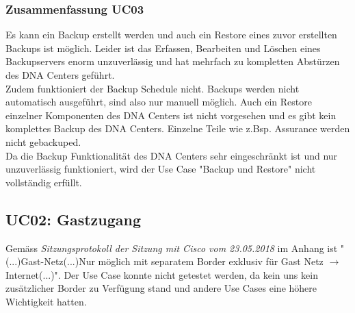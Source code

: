 \begin{landscape}
\subsubsection{Zusammenfassung UC03}
Es kann ein Backup erstellt werden und auch ein Restore eines zuvor erstellten Backups ist möglich. Leider ist das Erfassen, Bearbeiten und Löschen eines Backupservers enorm unzuverlässig und hat mehrfach zu kompletten Abstürzen des DNA Centers geführt. \\
Zudem funktioniert der Backup Schedule nicht. Backups werden nicht automatisch ausgeführt, sind also nur manuell möglich. Auch ein Restore einzelner Komponenten des DNA Centers ist nicht vorgesehen und es gibt kein komplettes Backup des DNA Centers. Einzelne Teile wie z.Bsp. Assurance werden nicht gebackuped. \\
Da die Backup Funktionalität des DNA Centers sehr eingeschränkt ist und nur unzuverlässig funktioniert, wird der Use Case "Backup und Restore" nicht vollständig erfüllt.
\pagebreak

\pagebreak

\subsection{UC02: Gastzugang}
Gemäss \textit{Sitzungsprotokoll der Sitzung mit Cisco vom 23.05.2018} im Anhang ist "(...)Gast-Netz(...)Nur möglich mit separatem Border exklusiv für Gast Netz $\rightarrow$ Internet(...)". Der Use Case konnte nicht getestet werden, da kein uns kein zusätzlicher Border zu Verfügung stand und andere Use Cases eine höhere Wichtigkeit hatten. 



\end{landscape}
